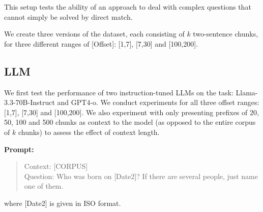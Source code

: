 \documentclass[11pt]{article}
\begin{document}
This setup tests the ability of an approach to deal with
complex questions that cannot simply be solved by direct
match.

We create three versions of the  dataset, each consisting of
$k$ two-sentence chunks, for three
different ranges of [Offset]: [1,7], [7,30] and [100,200].


\subsection{LLM}
We first test the performance of two instruction-tuned LLMs on the task:
Llama-3.3-70B-Instruct and GPT4-o. We conduct experiments
for all three offset ranges: [1,7], [7,30] and [100,200]. We
also experiment with only presenting prefixes of
20, 50, 100 and 500 chunks as context to the model (as opposed to
the entire corpus of $k$ chunks) to 
assess the effect of context length.





\textbf{Prompt:}
\begin{quote}
Context: [CORPUS]\\
Question:  Who was born on [Date2]? If there are several
people, just name one of them.
\end{quote}
where [Date2] is given in ISO format.
\end{document}
